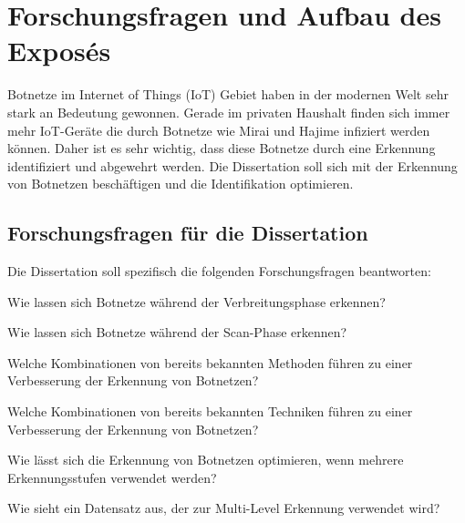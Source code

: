 \section{Forschungsfragen und Aufbau des Exposés}

Botnetze im Internet of Things (IoT) Gebiet haben in der modernen Welt sehr stark an Bedeutung gewonnen. Gerade im privaten 
Haushalt finden sich immer mehr IoT-Geräte die durch Botnetze wie Mirai und Hajime infiziert werden können. Daher ist es 
sehr wichtig, dass diese Botnetze durch eine Erkennung identifiziert und abgewehrt werden. Die Dissertation soll sich mit 
der Erkennung von Botnetzen beschäftigen und die Identifikation optimieren.

\subsection*{Forschungsfragen für die Dissertation}


Die Dissertation soll spezifisch die folgenden Forschungsfragen beantworten:  

\begin{questions}
    \item Wie lassen sich Botnetze während der Verbreitungsphase erkennen? \label{itm:q1}
    \item Wie lassen sich Botnetze während der Scan-Phase erkennen? \label{itm:q2}
    \item Welche Kombinationen von bereits bekannten Methoden führen zu einer Verbesserung der Erkennung von Botnetzen? \label{itm:q3}
    \item Welche Kombinationen von bereits bekannten Techniken führen zu einer Verbesserung der Erkennung von Botnetzen? \label{itm:q4}
    \item Wie lässt sich die Erkennung von Botnetzen optimieren, wenn mehrere Erkennungsstufen verwendet werden? \label{itm:q5}
    \item Wie sieht ein Datensatz aus, der zur Multi-Level Erkennung verwendet wird? \label{itm:q6}
\end{questions}

